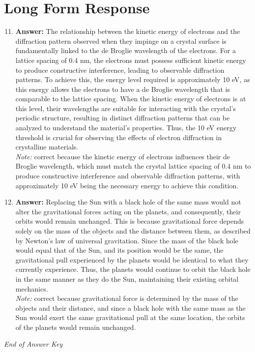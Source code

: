 \documentclass[12pt]{article}
\begin{document}
\section*{Long Form Response}
\begin{enumerate}[label=\arabic*.]
\setcounter{enumi}{10}
\item \textbf{Answer:} The relationship between the kinetic energy of electrons and the diffraction pattern observed when they impinge on a crystal surface is fundamentally linked to the de Broglie wavelength of the electrons. For a lattice spacing of 0.4 nm, the electrons must possess sufficient kinetic energy to produce constructive interference, leading to observable diffraction patterns. To achieve this, the energy level required is approximately 10 eV, as this energy allows the electrons to have a de Broglie wavelength that is comparable to the lattice spacing. When the kinetic energy of electrons is at this level, their wavelengths are suitable for interacting with the crystal's periodic structure, resulting in distinct diffraction patterns that can be analyzed to understand the material's properties. Thus, the 10 eV energy threshold is crucial for observing the effects of electron diffraction in crystalline materials.
\\ \textit{Note:} correct because the kinetic energy of electrons influences their de Broglie wavelength, which must match the crystal lattice spacing of 0.4 nm to produce constructive interference and observable diffraction patterns, with approximately 10 eV being the necessary energy to achieve this condition.
\item \textbf{Answer:} Replacing the Sun with a black hole of the same mass would not alter the gravitational forces acting on the planets, and consequently, their orbits would remain unchanged. This is because gravitational force depends solely on the mass of the objects and the distance between them, as described by Newton's law of universal gravitation. Since the mass of the black hole would equal that of the Sun, and its position would be the same, the gravitational pull experienced by the planets would be identical to what they currently experience. Thus, the planets would continue to orbit the black hole in the same manner as they do the Sun, maintaining their existing orbital mechanics.
\\ \textit{Note:} correct because gravitational force is determined by the mass of the objects and their distance, and since a black hole with the same mass as the Sun would exert the same gravitational pull at the same location, the orbits of the planets would remain unchanged.
\end{enumerate}

\vfill
\noindent\textit{End of Answer Key}
\end{document}
